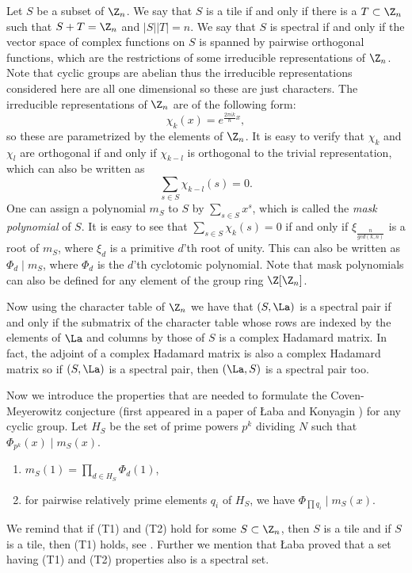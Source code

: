         Let $S $ be a subset of $\Z_n$. We say that $S$ is a tile if and only if there is a $T \subset \Z_n$ such that $S+T=\Z_n$ and $|S||T|=n$. 
        We say that $S$ is spectral if and only if the vector space of complex functions on $S$ is spanned by pairwise orthogonal functions, which are the restrictions of some irreducible representations of $\Z_n$. Note that cyclic groups are abelian thus the irreducible representations considered here are all one dimensional so these are just characters. The irreducible representations of $\Z_n$ are of the following form: 
        \[ \chi_k(x)=e^{\frac{2 \pi i k}{n}x},\]
        so these are parametrized by the elements of $\Z_n$. It is easy to verify that $\chi_k$ and $\chi_l$ are orthogonal if and only if $\chi_{k-l}$ is orthogonal to the trivial representation, which can also be written as 
        \[ \sum_{s\in S} \chi_{k-l}(s)=0.
        \]
        One can assign a polynomial $m_S$ to $S$ by $\sum_{s \in S}x^s$, which is called the {\it mask polynomial} of $S$. It is easy to see that $\sum_{s\in S} \chi_{k}(s)=0$ if and only if $\xi_{\frac{n}{gcd(k,n)}}$ is a root of $m_S$, where $\xi_d$ is a primitive $d$'th root of unity. This can also be written as $\Phi_d \mid m_S$, where $\Phi_d$ is the $d$'th cyclotomic polynomial. 
        Note that mask polynomials can also be defined for any element of the group ring $\Z[\Z_n]$.
        
        Now using the character table of $\Z_n$ we have that $(S,\La)$ is a spectral pair if and only if the submatrix of the character table whose rows are indexed by the elements of $\La$ and columns by those of $S$ is a complex Hadamard matrix. In fact, the adjoint of a complex Hadamard matrix is also a complex Hadamard matrix so if $(S,\La)$ is a spectral pair, then $(\La,S)$ is a spectral pair too. 
        
        Now we introduce the properties that are needed to formulate the Coven-Meyerowitz conjecture (first appeared in a paper of \L aba and Konyagin \cite{labakonyagin}) for any cyclic group. Let $H_S$ be the
        set of prime powers $p^k$ dividing $N$ such that $\Phi_{p^k}(x) \mid
        m_S(x)$.
        \begin{enumerate}[{\bf(T1)}]
             \item\label{t1} $m_S(1)=\prod_{d \in H_S} \Phi_d(1)$,
         \item\label{t2} for pairwise relatively prime elements $q_i$ of $H_S$, we have $\Phi_{\prod q_i} \mid m_S(x)$.
        \end{enumerate}
        We remind that if (T1) and (T2) hold for some $S \subset \Z_n$, then $S$ is a tile and if $S$ is a tile, then (T1) holds, see \cite{cm}. Further we mention that \L aba \cite{laba} proved that a set having (T1) and (T2) properties also is a spectral set.
